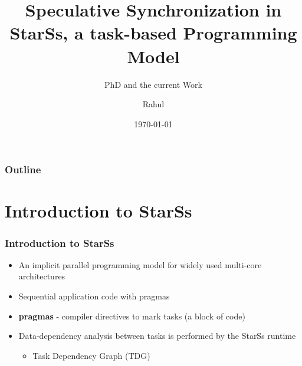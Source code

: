 \documentclass{beamer}
\title{Speculative Synchronization in StarSs, a task-based Programming Model}
\subtitle{PhD and the current Work}
\author{Rahul}
\date{\today}
\begin{document}
\begin{frame}
 \titlepage
\end{frame}

\begin{frame}
 \frametitle{Outline}
 \tableofcontents
\end{frame}


\section{Introduction to StarSs}

\begin{frame}

\frametitle{Introduction to StarSs}

  \begin{itemize}
   \item An implicit parallel programming model for widely used multi-core architectures
   \item Sequential application code with pragmas
   \item \textbf{pragmas} - compiler directives to mark tasks (a block of code)
   \item Data-dependency analysis between tasks is performed by the StarSs runtime
   \begin{itemize}
    \item Task Dependency Graph (TDG)
   \end{itemize}
  \end{itemize}
  
\end{frame}
\end{document}
